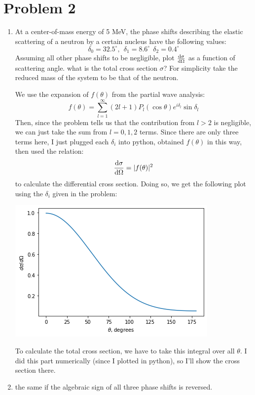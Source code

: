\documentclass[10pt]{article}
\begin{document}
	\section*{Problem 2}
	\begin{enumerate}[label=\alph*)]
		\item At a center-of-mass energy of 5 MeV, the phase shifts describing the elastic scattering of a
			neutron by a certain nucleus have the following values:
			\[
			\delta_0 = 32.5^\circ , \ \ \delta_1 = 8.6^\circ \ \ \delta_2 = 0.4^\circ
			\] 
			Assuming all other phase shifts to be negligible, plot $\dv{\sigma}{\Omega}$ as a function of 
			scattering angle. what is the total cross section $\sigma$? For simplicity take the reduced mass of 
			the system to be that of the neutron. 

			\begin{solution}
				We use the expansion of $f(\theta)$ from the partial wave analysis:
				\[
					f(\theta) = \sum_{l = 1}^\infty (2l+1)P_l(\cos \theta) e^{i \delta_l} \sin \delta_l
				\] 
				Then, since the problem tells us that the contribution from $l > 2$ is negligible, we can 
				just take the sum from $l = 0, 1, 2$ terms. Since there are only three terms here, I just 
				plugged each $\delta_i$ into python, obtained $f(\theta)$ in this way, then used the relation:
				\[
					\dv{\sigma}{\Omega} = |f(\theta)|^2
				\] 
				to calculate the differential cross section. Doing so, we get the following plot using the 
				$\delta_i$ given in the problem:
				\begin{center}
					\includegraphics[scale=0.8]{q2a.png}
				\end{center}
				To calculate the total cross section, we have to take this integral over all $\theta$. I
				did this part numerically (since I plotted in python), so I'll show the cross section there.
			\end{solution}
		\item the same if the algebraic sign of all three phase shifts is reversed. 


\end{enumerate}
\end{document}
